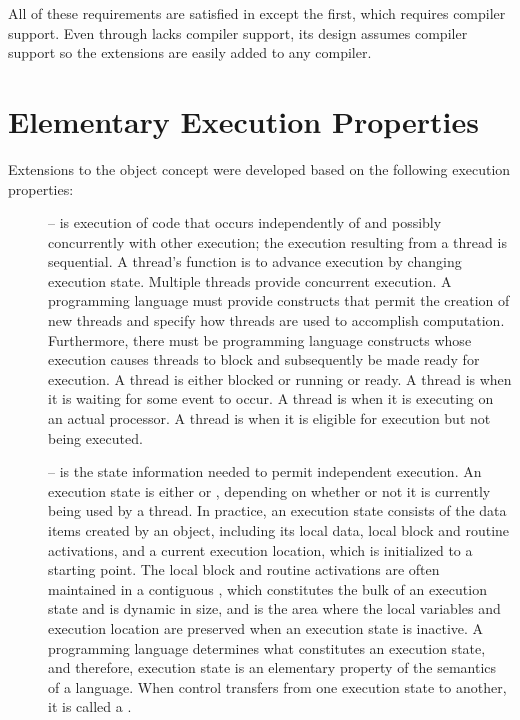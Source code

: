 \documentclass[openright,twoside]{report}
\begin{document}
All of these requirements are satisfied in \uC except the first, which requires compiler support.
Even through \uC lacks compiler support, its design assumes compiler support so the extensions are easily added to any \CC compiler.


\section{Elementary Execution Properties}
\label{s:ElementaryExecutionProperties}

Extensions to the object concept were developed based on the following execution properties:
\begin{description}
\item[] --
is execution of code that occurs independently of and possibly concurrently with other execution;
the execution resulting from a thread is sequential.
A thread's function is to advance execution by changing execution state.
Multiple threads provide concurrent execution.
A programming language must provide constructs that permit the creation of new threads and specify how threads are used to accomplish computation.
Furthermore, there must be programming language constructs whose execution causes threads to block and subsequently be made ready for execution.
A thread is either blocked or running or ready.
A thread is  when it is waiting for some event to occur.
A thread is  when it is executing on an actual processor.
A thread is  when it is eligible for execution but not being executed.

\item[] --
is the state information needed to permit independent execution.
An execution state is either  or , depending on whether or not it is currently being used by a thread.
In practice, an execution state consists of the data items created by an object, including its local data, local block and routine activations, and a current execution location, which is initialized to a starting point.
The local block and routine activations are often maintained in a contiguous , which constitutes the bulk of an execution state and is dynamic in size, and is the area where the local variables and execution location are preserved when an execution state is inactive.
A programming language determines what constitutes an execution state, and therefore, execution state is an elementary property of the semantics of a language.
When control transfers from one execution state to another, it is called a .


\end{description}
\end{document}
